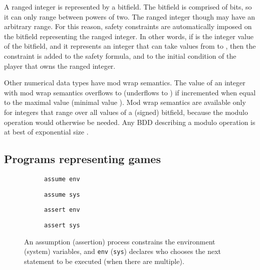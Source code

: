\documentclass[copyright]{eptcs}
\begin{document}
A ranged integer is represented by a bitfield.
The bitfield is comprised of bits, so it can only range between powers of two.
The ranged integer though may have an arbitrary range.
For this reason, safety constraints are automatically imposed on the bitfield representing the ranged integer.
In other words, if  is the integer value of the bitfield, and it represents an integer that can take values from  to , then the constraint  is added to the safety formula, and  to the initial condition of the player that owns the ranged integer.

Other numerical data types have mod wrap semantics.
The value of an integer with mod wrap semantics overflows to  (underflows to ) if incremented when equal to the maximal value  (minimal value ).
Mod wrap semantics are available only for integers that range over all values of a (signed) bitfield, because the modulo operation would otherwise be needed.
Any BDD describing a modulo operation is at best of exponential size \cite{Bryant86tc}.


\subsection{Programs representing games}
\label{sec:game-graphs}

\begin{figure}
	\begin{subfigure}{0.24\textwidth}
		\centering
		
		\caption{\texttt{assume env}}
	\end{subfigure}
	\begin{subfigure}{0.24\textwidth}
		\centering
		
		\caption{\texttt{assume sys}}
	\end{subfigure}
	\begin{subfigure}{0.24\textwidth}
		\centering
		
		\caption{\texttt{assert env}}
	\end{subfigure}
	\begin{subfigure}{0.24\textwidth}
		\centering
		
		\caption{\texttt{assert sys}}
	\end{subfigure}
	\caption{An assumption (assertion) process constrains the environment (system) variables, and \texttt{env} (\texttt{sys}) declares who chooses the next statement to be executed (when there are multiple).}
	\label{fig:flow-quantification}
\end{figure}
\end{document}
